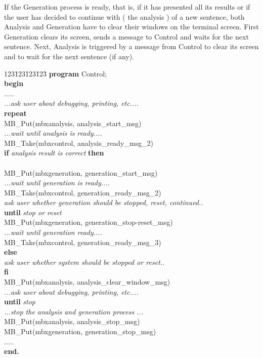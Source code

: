 If the Generation process is ready, that is, if it has presented all its 
results or if the user has decided to continue with ( the analysis ) of a 
new sentence, both Analysis and Generation have to clear their windows on the
terminal screen. First Generation clears its screen, sends a message to
Control and waits for the next sentence. Next, Analysis is triggered by a 
message from Control to clear its screen and to wait for the next sentence (if 
any). 
\begin{tabbing}
123\= 123\= 123\= 123\= \kill
{\bf program} Control; \\
{\bf begin} \\
\> ..... \\
\> {\em ...ask user about debugging, printing, etc....} \\
\> {\bf repeat} \\
\> \> MB\_Put(mbxanalysis, analysis\_start\_msg) \\
\> \> {\em ...wait until analysis is ready....} \\
\> \> MB\_Take(mbxcontrol, analysis\_ready\_msg\_2) \\
\> \> {\bf if} {\em analysis result is correct} {\bf then} \\
\> \>  \\
\> \> \> \> MB\_Put(mbxgeneration, generation\_start\_msg) \\
\> \> \> \> {\em ...wait until generation is ready....} \\
\> \> \> \> MB\_Take(mbxcontrol, generation\_ready\_msg\_2) \\
\> \> \> \> {\em ask user whether generation should be stopped, reset, continued..} \\
\> \> \> {\bf until} {\em stop or reset} \\
\> \> \> MB\_Put(mbxgeneration, generation\_stop-reset\_msg) \\
\> \> \> {\em ...wait until generation ready....} \\
\> \> \> MB\_Take(mbxcontrol, generation\_ready\_msg\_3) \\
\> \> {\bf else} \\
\> \> \> {\em ask user whether system should be stopped or reset..} \\
\> \> {\bf fi} \\
\> \> MB\_Put(mbxanalysis, analysis\_clear\_window\_msg) \\
\> \> {\em ...ask user about debugging, printing, etc....} \\
\> {\bf until } {\em stop } \\
\> {\em ...stop the analysis and generation process ...} \\
\> MB\_Put(mbxanalysis, analysis\_stop\_msg) \\
\> MB\_Put(mbxgeneration, generation\_stop\_msg) \\
\> ..... \\
{\bf end.} \\
\end{tabbing}
